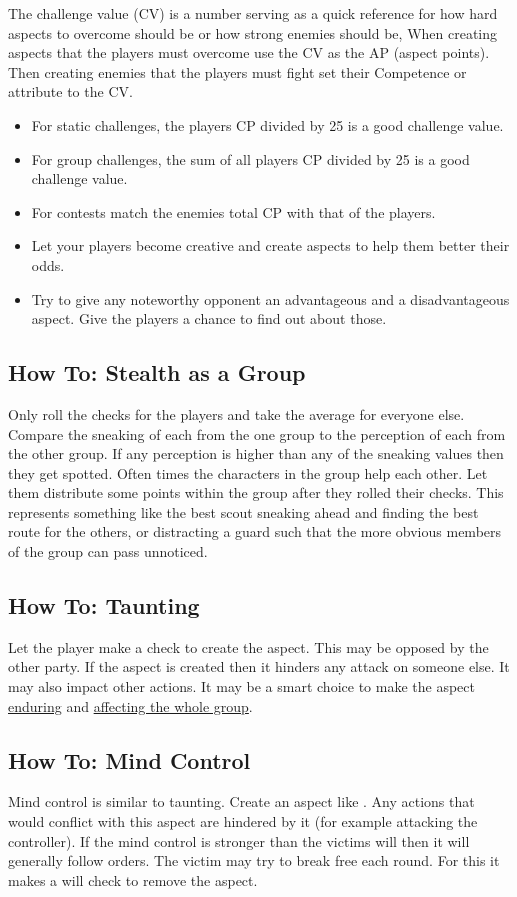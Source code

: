 \documentclass[11pt]{article}
\begin{document}
{The challenge value (CV) is a number serving as a quick reference for how hard aspects to overcome should be or how strong enemies should be, When creating aspects that the players must overcome use the CV as the AP (aspect points). Then creating enemies that the players must fight set their Competence or attribute to the CV.
\begin{itemize}
\item For static challenges, the players CP divided by 25 is a good challenge value.
\item For group challenges, the sum of all players CP divided by 25 is a good challenge value.
\item For contests match the enemies total CP with that of the players.
\item Let your players become creative and create aspects to help them better their odds.
\item Try to give any noteworthy opponent an advantageous and a disadvantageous aspect. Give the players a chance to find out about those.
\end{itemize}
\subsection{How To: Stealth as a Group}
\label{sec:org6f06139}

Only roll the checks for the players and take the average for everyone else. Compare the sneaking of each from the one group to the perception of each from the other group. If any perception is higher than any of the sneaking values then they get spotted.
Often times the characters in the group help each other. Let them distribute some points within the group after they rolled their checks. This represents something like the best scout sneaking ahead and finding the best route for the others, or distracting a guard such that the more obvious members of the group can pass unnoticed.
\subsection{How To: Taunting}
\label{sec:orgc3aafa9}
Let the player make a check to create the  aspect. This may be opposed by the other party. If the aspect is created then it hinders any attack on someone else. It may also impact other actions. It may be a smart choice to make the  aspect \hyperref[sec:orgd783730]{enduring} and \hyperref[sec:org351c28f]{affecting the whole group}. 
\subsection{How To: Mind Control}
\label{sec:org4c878f0}
Mind control is similar to taunting. Create an aspect like . Any actions that would conflict with this aspect are hindered by it (for example attacking the controller). If the mind control is stronger than the victims will then it will generally follow orders. The victim may try to break free each round. For this it makes a will check to remove the  aspect.

}
\end{document}
